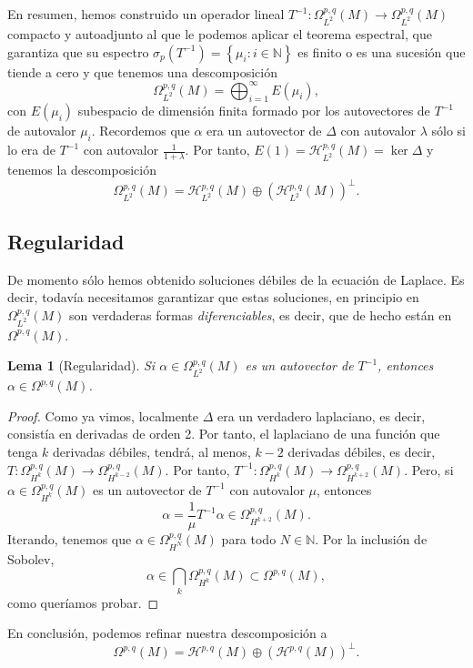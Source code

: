 \documentclass[12pt,a4paper]{article}
\newtheorem{lema}[thm]{Lema}
\theoremstyle{definition} \newtheorem{defn}[thm]{Definición}
\theoremstyle{definition} \newtheorem{ejemplo}[thm]{Ejemplo}
\theoremstyle{definition} \newtheorem{ejercicio}[thm]{Ejercicio}
\theoremstyle{remark} \newtheorem*{obs}{Observación}
\newcommand{\NN}{\mathbb{N}}
\begin{document}
    En resumen, hemos construido un operador lineal $T^{-1}:\Omega^{p,q}_{L^2}(M)\rightarrow \Omega^{p,q}_{L^2}(M)$ compacto y autoadjunto al que le podemos aplicar el teorema espectral, que garantiza que su espectro $\sigma_p(T^{-1})=\left\{ \mu_i:i\in \NN \right\}$ es finito o es una sucesión que tiende a cero y que tenemos una descomposición
    \begin{equation*}
      \Omega^{p,q}_{L^2}(M)=\bigoplus_{i=1}^{\infty} E(\mu_i),
    \end{equation*}
    con $E(\mu_i)$ subespacio de dimensión finita formado por los autovectores de $T^{-1}$ de autovalor $\mu_i$. Recordemos que $\alpha$ era un autovector de $\Delta$ con autovalor $\lambda$ sólo si lo era de $T^{-1}$ con autovalor $\frac{1}{1+\lambda}$. Por tanto, $E(1)=\mathcal{H}^{p,q}_{L^2}(M)=\ker \Delta$ y tenemos la descomposición
    \begin{equation*}
      \Omega^{p,q}_{L^2}(M)=\mathcal{H}^{p,q}_{L^2}(M)\oplus(\mathcal{H}^{p,q}_{L^2}(M))^{\perp}.
    \end{equation*}

    \subsection{Regularidad}
    De momento sólo hemos obtenido soluciones débiles de la ecuación de Laplace. Es decir, todavía necesitamos garantizar que estas soluciones, en principio en $\Omega^{p,q}_{L^2}(M)$ son verdaderas formas \emph{diferenciables}, es decir, que de hecho están en $\Omega^{p,q}(M)$.

    \begin{lema}[Regularidad]
      Si $\alpha \in \Omega^{p,q}_{L^2}(M)$ es un autovector de $T^{-1}$, entonces $\alpha \in \Omega^{p,q}(M)$.
    \end{lema}
    \begin{proof}
      Como ya vimos, localmente $\Delta$ era un verdadero laplaciano, es decir, consistía en derivadas de orden 2. Por tanto, el laplaciano de una función que tenga $k$ derivadas débiles, tendrá, al menos, $k-2$ derivadas débiles, es decir, $T:\Omega^{p,q}_{H^k}(M) \rightarrow \Omega^{p,q}_{H^{k-2}}(M)$. Por tanto, $T^{-1}:\Omega^{p,q}_{H^{k}}(M) \rightarrow \Omega^{p,q}_{H^{k+2}}(M)$.     Pero, si $\alpha\in \Omega^{p,q}_{H^k}(M)$ es un autovector de $T^{-1}$ con autovalor $\mu$, entonces $$\alpha =\frac{1}{\mu} T^{-1}\alpha \in \Omega^{p,q}_{H^{k+2}}(M).$$ Iterando, tenemos que $\alpha \in \Omega^{p,q}_{H^{N}}(M)$ para todo $N\in \NN$. Por la inclusión de Sobolev,
      \begin{equation*}
	\alpha \in \bigcap_k \Omega^{p,q}_{H^k}(M) \subset \Omega^{p,q}(M),
      \end{equation*}
      como queríamos probar.
    \end{proof}
    En conclusión, podemos refinar nuestra descomposición a
    \begin{equation*}
      \Omega^{p,q}(M)=\mathcal{H}^{p,q}(M) \oplus (\mathcal{H}^{p,q}(M))^{\perp}.
    \end{equation*}
\end{document}
